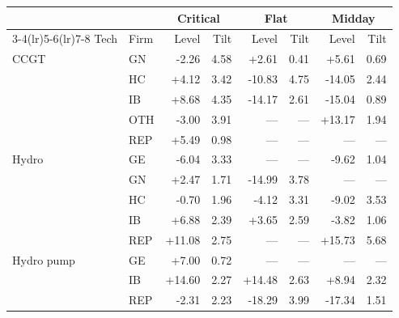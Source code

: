 \begin{tabular}{l l r r r r r r}
\toprule
 & & \multicolumn{2}{c}{Critical} & \multicolumn{2}{c}{Flat} & \multicolumn{2}{c}{Midday} \\
\cmidrule(lr){3-4}\cmidrule(lr){5-6}\cmidrule(lr){7-8}
Tech & Firm & Level & Tilt & Level & Tilt & Level & Tilt \\
\midrule
CCGT & GN & -2.26 & 4.58 & +2.61 & 0.41 & +5.61 & 0.69 \\
 & HC & +4.12 & 3.42 & -10.83 & 4.75 & -14.05 & 2.44 \\
 & IB & +8.68 & 4.35 & -14.17 & 2.61 & -15.04 & 0.89 \\
 & OTH & -3.00 & 3.91 & --- & --- & +13.17 & 1.94 \\
 & REP & +5.49 & 0.98 & --- & --- & --- & --- \\
\addlinespace
Hydro & GE & -6.04 & 3.33 & --- & --- & -9.62 & 1.04 \\
 & GN & +2.47 & 1.71 & -14.99 & 3.78 & --- & --- \\
 & HC & -0.70 & 1.96 & -4.12 & 3.31 & -9.02 & 3.53 \\
 & IB & +6.88 & 2.39 & +3.65 & 2.59 & -3.82 & 1.06 \\
 & REP & +11.08 & 2.75 & --- & --- & +15.73 & 5.68 \\
\addlinespace
Hydro pump & GE & +7.00 & 0.72 & --- & --- & --- & --- \\
 & IB & +14.60 & 2.27 & +14.48 & 2.63 & +8.94 & 2.32 \\
 & REP & -2.31 & 2.23 & -18.29 & 3.99 & -17.34 & 1.51 \\
\bottomrule
\end{tabular}